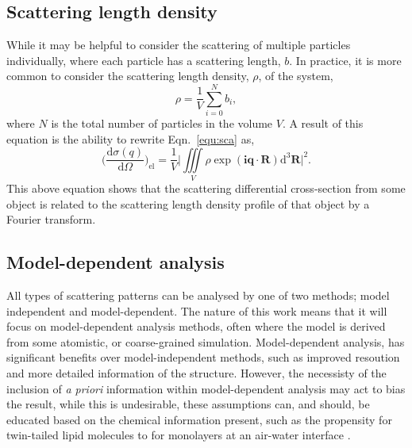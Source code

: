 \subsection{Scattering length density}
\label{sec:sld}

While it may be helpful to consider the scattering of multiple particles individually, where each particle has a scattering length, $b$.
In practice, it is more common to consider the scattering length density, $\rho$, of the system,
%
\begin{equation}
	\rho = \frac{1}{V}\sum_{i=0}^{N} b_i,
\end{equation}
%
where $N$ is the total number of particles in the volume $V$.
A result of this equation is the ability to rewrite Eqn.~\ref{equ:sca} as,
%
\begin{equation}
	\bigg(\frac{\text{d}\sigma(q)}{\text{d}\Omega}\bigg)_{\text{el}} = \frac{1}{V} \Bigg|\iiint \limits_V \rho\exp{(\mathbf{iq}\cdot\mathbf{R})}\text{d}^3\mathbf{R}\Bigg|^2.
	\label{equ:sldsca}
\end{equation}
%
This above equation shows that the scattering differential cross-section from some object is related to the scattering length density profile of that object by a Fourier transform.

\subsection{Model-dependent analysis}

All types of scattering patterns can be analysed by one of two methods; model independent and model-dependent.
The nature of this work means that it will focus on model-dependent analysis methods, often where the model is derived from some atomistic, or coarse-grained simulation. Model-dependent analysis, has significant benefits over model-independent methods, such as improved resoution and more detailed information of the structure.
However, the necessisty of the inclusion of \emph{a priori} information within model-dependent analysis may act to bias the result, while this is undesirable, these assumptions can, and should, be educated based on the chemical information present, such as the propensity for twin-tailed lipid molecules to for monolayers at an air-water interface \cite{McCluskey2018}.

